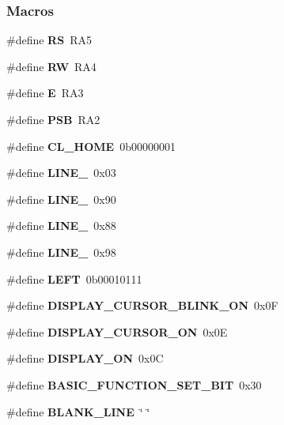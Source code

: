 \subsubsection*{Macros}
\begin{DoxyCompactItemize}
\item 
\#define \textbf{ RS}~R\+A5
\item 
\#define \textbf{ RW}~R\+A4
\item 
\#define \textbf{ E}~R\+A3
\item 
\#define \textbf{ P\+SB}~R\+A2
\item 
\#define \textbf{ C\+L\+\_\+\+H\+O\+ME}~0b00000001
\item 
\#define \textbf{ L\+I\+N\+E\+\_}~0x03
\item 
\#define \textbf{ L\+I\+N\+E\+\_}~0x90
\item 
\#define \textbf{ L\+I\+N\+E\+\_}~0x88
\item 
\#define \textbf{ L\+I\+N\+E\+\_}~0x98
\item 
\#define \textbf{ L\+E\+FT}~0b00010111
\item 
\#define \textbf{ D\+I\+S\+P\+L\+A\+Y\+\_\+\+C\+U\+R\+S\+O\+R\+\_\+\+B\+L\+I\+N\+K\+\_\+\+ON}~0x0F
\item 
\#define \textbf{ D\+I\+S\+P\+L\+A\+Y\+\_\+\+C\+U\+R\+S\+O\+R\+\_\+\+ON}~0x0E
\item 
\#define \textbf{ D\+I\+S\+P\+L\+A\+Y\+\_\+\+ON}~0x0C
\item 
\#define \textbf{ B\+A\+S\+I\+C\+\_\+\+F\+U\+N\+C\+T\+I\+O\+N\+\_\+\+S\+E\+T\+\_\+B\+IT}~0x30
\item 
\#define \textbf{ B\+L\+A\+N\+K\+\_\+\+L\+I\+NE}~\char`\"{}                \char`\"{}
\end{DoxyCompactItemize}
